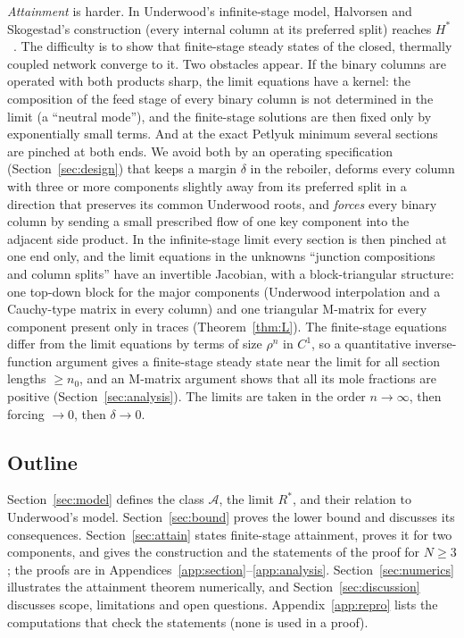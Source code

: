 \documentclass[11pt,a4paper]{report}
\newcommand{\cA}{\mathcal A}
\newcommand{\Hs}{H^{*}}
\begin{document}
\emph{Attainment} is harder. In Underwood's infinite-stage model, Halvorsen and Skogestad's construction (every internal
column at its preferred split) reaches \(\Hs\)~\autocite{HS3}. The difficulty is to show that finite-stage steady states
of the closed, thermally coupled network converge to it. Two obstacles appear. If the binary columns are operated with
both products sharp, the limit equations have a kernel: the composition of the feed stage of every binary column is not
determined in the limit (a ``neutral mode''), and the finite-stage solutions are then fixed only by exponentially small
terms. And at the exact Petlyuk minimum several sections are pinched at both ends. We avoid both by an operating
specification (Section~\ref{sec:design}) that keeps a margin \(\delta\) in the reboiler, deforms every column with three
or more components slightly away from its preferred split in a direction that preserves its common Underwood roots, and
\emph{forces} every binary column by sending a small prescribed flow of one key component into the adjacent side product.
In the infinite-stage limit every section is then pinched at one end only, and the limit equations in the unknowns
``junction compositions and column splits'' have an invertible Jacobian, with a block-triangular structure: one
top-down block for the major components (Underwood interpolation and a Cauchy-type matrix in every column) and one
triangular M-matrix for every component present only in traces (Theorem~\ref{thm:L}). The finite-stage equations
differ from the limit equations by terms of size \(\rho^{n}\) in \(C^1\), so a quantitative inverse-function argument
gives a finite-stage steady state near the limit for all section lengths \(\ge n_0\), and an M-matrix argument shows
that all its mole fractions are positive (Section~\ref{sec:analysis}). The limits are taken in the order
\(n\to\infty\), then forcing \(\to0\), then \(\delta\to0\).

\subsection{Outline}

Section~\ref{sec:model} defines the class \(\cA\), the limit \(R^*\), and their relation to Underwood's model.
Section~\ref{sec:bound} proves the lower bound and discusses its consequences. Section~\ref{sec:attain} states
finite-stage attainment, proves it for two components, and gives the construction and the statements of the proof for
\(N\ge3\); the proofs are in Appendices~\ref{app:section}--\ref{app:analysis}. Section~\ref{sec:numerics} illustrates
the attainment theorem numerically, and Section~\ref{sec:discussion} discusses scope, limitations and open questions.
Appendix~\ref{app:repro} lists the computations that check the statements (none is used in a proof).
\end{document}
